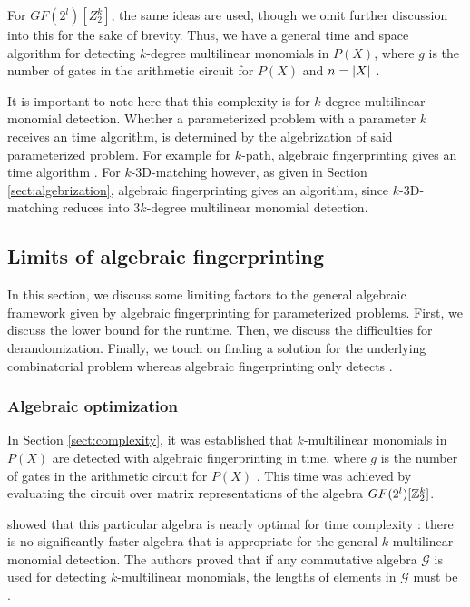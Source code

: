For $GF(2^{l})[Z_2^k]$, the same ideas are used, though we omit 
further discussion into this for the sake of brevity. 
Thus, we have a general 
 time and  space algorithm for detecting 
$k$-degree multilinear monomials in $P(X)$, where $g$ is the number of gates in the 
arithmetic circuit for $P(X)$ and $n = {\left\vert X\right\vert}$ \cite{KouWil09}.

It is important to note here that this complexity is for $k$-degree 
multilinear monomial detection. Whether a parameterized problem with a parameter 
$k$ receives an  time algorithm, is determined by the algebrization 
of said parameterized problem. 
For example for $k$-path, algebraic fingerprinting gives an  
time algorithm \cite{Williams09}. 
For $k$-3D-matching however, as given in Section \ref{sect:algebrization}, 
algebraic fingerprinting gives an  algorithm, since 
$k$-3D-matching reduces into $3k$-degree multilinear monomial detection.


\subsection{Limits of algebraic fingerprinting}
\label{sect:limits}

In this section, we discuss some limiting factors to the general 
algebraic framework given by 
algebraic fingerprinting for parameterized problems. First, 
we discuss the lower bound for the runtime. Then, we discuss 
the difficulties for derandomization. Finally, we touch on
finding a solution for the underlying combinatorial problem 
whereas algebraic fingerprinting only detects
.

\subsubsection{Algebraic optimization}
\label{sect:algebra_is_optimal}

In Section \ref{sect:complexity}, it was established that $k$-multilinear monomials 
in $P(X)$ are detected with 
algebraic fingerprinting in  time, where 
$g$ is the number of gates in the arithmetic circuit for $P(X)$ \cite{Williams09}. 
This time was achieved by evaluating the circuit over matrix 
representations of the algebra $GF(2^l)[\mathbb Z_2^k]$.

\citeauthor{KouWil09} showed that this particular algebra is nearly optimal 
for time complexity \cite{KouWil09}: there is no significantly faster algebra that 
is appropriate for the general $k$-multilinear monomial detection. 
The authors proved that if any commutative algebra $\mathcal{G}$ is 
used for detecting $k$-multilinear monomials, 
the lengths of elements in $\mathcal{G}$ must be .

